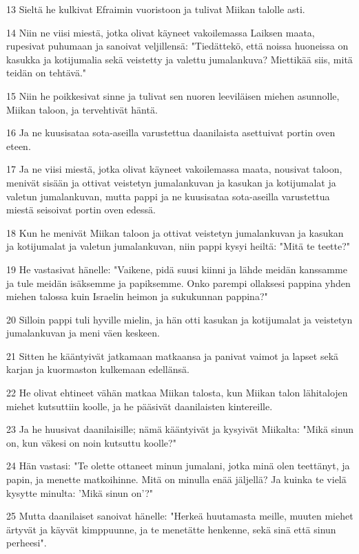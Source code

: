 \par 13 Sieltä he kulkivat Efraimin vuoristoon ja tulivat Miikan talolle asti.
\par 14 Niin ne viisi miestä, jotka olivat käyneet vakoilemassa Laiksen maata, rupesivat puhumaan ja sanoivat veljillensä: "Tiedättekö, että noissa huoneissa on kasukka ja kotijumalia sekä veistetty ja valettu jumalankuva? Miettikää siis, mitä teidän on tehtävä."
\par 15 Niin he poikkesivat sinne ja tulivat sen nuoren leeviläisen miehen asunnolle, Miikan taloon, ja tervehtivät häntä.
\par 16 Ja ne kuusisataa sota-aseilla varustettua daanilaista asettuivat portin oven eteen.
\par 17 Ja ne viisi miestä, jotka olivat käyneet vakoilemassa maata, nousivat taloon, menivät sisään ja ottivat veistetyn jumalankuvan ja kasukan ja kotijumalat ja valetun jumalankuvan, mutta pappi ja ne kuusisataa sota-aseilla varustettua miestä seisoivat portin oven edessä.
\par 18 Kun he menivät Miikan taloon ja ottivat veistetyn jumalankuvan ja kasukan ja kotijumalat ja valetun jumalankuvan, niin pappi kysyi heiltä: "Mitä te teette?"
\par 19 He vastasivat hänelle: "Vaikene, pidä suusi kiinni ja lähde meidän kanssamme ja tule meidän isäksemme ja papiksemme. Onko parempi ollaksesi pappina yhden miehen talossa kuin Israelin heimon ja sukukunnan pappina?"
\par 20 Silloin pappi tuli hyville mielin, ja hän otti kasukan ja kotijumalat ja veistetyn jumalankuvan ja meni väen keskeen.
\par 21 Sitten he kääntyivät jatkamaan matkaansa ja panivat vaimot ja lapset sekä karjan ja kuormaston kulkemaan edellänsä.
\par 22 He olivat ehtineet vähän matkaa Miikan talosta, kun Miikan talon lähitalojen miehet kutsuttiin koolle, ja he pääsivät daanilaisten kintereille.
\par 23 Ja he huusivat daanilaisille; nämä kääntyivät ja kysyivät Miikalta: "Mikä sinun on, kun väkesi on noin kutsuttu koolle?"
\par 24 Hän vastasi: "Te olette ottaneet minun jumalani, jotka minä olen teettänyt, ja papin, ja menette matkoihinne. Mitä on minulla enää jäljellä? Ja kuinka te vielä kysytte minulta: 'Mikä sinun on'?"
\par 25 Mutta daanilaiset sanoivat hänelle: "Herkeä huutamasta meille, muuten miehet ärtyvät ja käyvät kimppuunne, ja te menetätte henkenne, sekä sinä että sinun perheesi".
